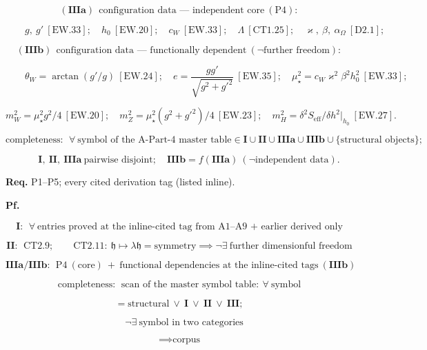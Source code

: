 \begin{theorem}
\[
(\mathbf{IIIa})\ \ \text{configuration data --- independent core}\ (\mathrm{P4}):
\]

\[
\qquad g,\ g'\ [\mathrm{EW.33}];\quad h_0\ [\mathrm{EW.20}];\quad c_W\ [\mathrm{EW.33}];\quad\Lambda\ [\mathrm{CT1.25}];\quad\varkappa,\ \beta,\ \alpha_\Omega\ [\mathrm{D2.1}];
\]

\[
(\mathbf{IIIb})\ \ \text{configuration data --- functionally dependent}\ (\neg\text{further freedom}):
\]

\[
\qquad \theta_W=\arctan(g'/g)\ [\mathrm{EW.24}];\quad e=\frac{gg'}{\sqrt{g^2+g'^2}}\ [\mathrm{EW.35}];\quad\mu_\star^2=c_W\varkappa^2\beta^2h_0^2\ [\mathrm{EW.33}];
\]

\[
m_W^2=\mu_\star^2g^2/4\ [\mathrm{EW.20}];\quad m_Z^2=\mu_\star^2(g^2+g'^2)/4\ [\mathrm{EW.23}];\quad m_H^2=\delta^2S_{\mathrm{eff}}/\delta h^2\big|_{h_0}\ [\mathrm{EW.27}].
\]

\[
\text{completeness}:\ \ \forall\ \text{symbol of the A-Part-4 master table}\in\mathbf I\cup\mathbf{II}\cup\mathbf{IIIa}\cup\mathbf{IIIb}\cup\{\text{structural objects}\};
\]

\[
\qquad \mathbf I,\ \mathbf{II},\ \mathbf{IIIa}\ \text{pairwise disjoint};\quad\mathbf{IIIb}=f(\mathbf{IIIa})\ (\neg\text{independent data}).
\]

\textbf{Req.} P1–P5; every cited derivation tag (listed inline).

\textbf{Pf.}

\[
\mathbf I:\ \ \forall\ \text{entries proved at the inline-cited tag from A1--A9 + earlier derived only}
\]

\[
\mathbf{II}:\ \ \mathrm{CT2.9};\qquad\mathrm{CT2.11}:\ \mathfrak h\mapsto\lambda\mathfrak h=\text{symmetry}\implies\neg\exists\ \text{further dimensionful freedom}
\]

\[
\mathbf{IIIa}/\mathbf{IIIb}:\ \ \mathrm{P4}\ (\text{core})\ +\ \text{functional dependencies at the inline-cited tags}\ (\mathbf{IIIb})
\]

\[
\text{completeness}:\ \ \text{scan of the master symbol table}:\ \forall\ \text{symbol}
\]

\[
= \text{structural}\ \vee\ \mathbf I\ \vee\ \mathbf{II}\ \vee\ \mathbf{III};
\]

\[
\quad\neg\exists\ \text{symbol in two categories}
\]

\[
\implies\text{corpus}
\]


\end{theorem}
